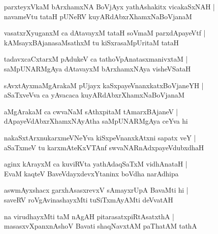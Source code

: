 \begin{shloka}
parxteyxVkaM bArxhamxNA BoVjAyx yathAshakitx vicakaSxNAH |\\
navameVtu tataH pUNeRV kuyARdAbxrXhamxNaBoVjanaM 
\end{shloka}

\begin{shloka}
vasatxrXyuganxM ca dAtavayxM tataH soVmaM parxdApayeVtf |\\
kAMsayxBAjanasaMsathxM tu kiSxrasaMpUritaM tataH 
\end{shloka}

\begin{shloka}
tadavxcaCxtarxM pAdukeV ca tathoVpAnatasxmanivxtaM |\\
saMpUNARMgAya dAtavayxM bArxhamxNAya visheVSataH
\end{shloka}

\begin{shloka}
sAvxtAyxmaMgArakaM pUjayx kaSxpayeVnanxkatxBoVjaneYH |\\
aSaTxveVva ca yAvacaca kuyARdAbxrXhamxNaBoVjanaM
\end{shloka}

\begin{shloka}
aMgArakaM ca cwvaNaM sAthxpitaM tAmarxBAjaneV |\\
dApayeVdAbxrXhamxNAyAtha saMpUNARMgAya ceYva hi
\end{shloka}

\begin{shloka}
nakaSxtArxnukarxmeVNeYva kiSxpeVnanxkAtxni sapatx veY |\\
aSaTxmeV tu karxmAteKxVTAnf swvaNARnAdxpayeVdubxdhaH
\end{shloka}

\begin{shloka}
aginx kArayxM ca kuviRVta yathAdaqSaTxM vidhAnataH |\\
EvaM kaqteV BaveVdayxdevxYtaninx boVdha narAdhipa
\end{shloka}

\begin{shloka}
aswmAyxshacx garxhAsasxrevxV sAmayxrUpA BavaMti hi |\\
saveRV roVgAvinashayxMti tuSiTxmAyAMti deVvatAH 
\end{shloka}

\begin{shloka}
na virudhayxMti taM nAgAH pitarasatxpiRtAsatxthA |\\
masasxvXpanxnAshoV Bavati shaqNavxtAM paThatAM tathA 
\end{shloka}

